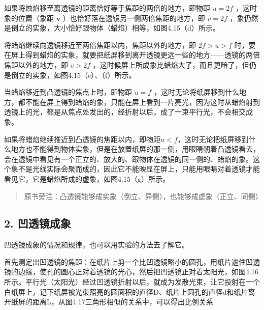 如果将烛焰移至离透镜的距离恰好等于焦距的两倍的地方，即物距 \(u = 2f\)
，这时象的位置（象距 \(\pmb{v}\)
）也恰好落在透镜另一侧两倍焦距的地方，即 \(v = 2f\)
，象仍然是倒立的实象，大小恰好跟物体（蜡焰）相等，如图4.15（d）所示。

将蜡焰继续向透镜移近至两倍焦距以内，焦距以外的地方，即 \(2f > u > f\)
时，要在屏上得到蜡焰的实象，就要把纸屏移到离开透镜更远一些的地方------透镜的两倍焦距以外的地方，即
\(v > 2f\)
，这时候屏上所成象比蜡焰大了，而且更暗了，但仍是倒立的实象，如图4.15（e）、（f）所示。

当蜡焰移近到凸透镜的焦点上时，即物距 \(u = f\)
，这时无论将纸屏移到什么地方，都不能在屏上得到蜡焰的象，只能在屏上看到一片亮光，因为这时从蜡焰射到透镜上的光，都是从焦点处发出的，经折射以后，成了一束平行光，不会相交成象。

如果将蜡焰继续推近到凸透镜的焦距以内，即物距\(u<f\)，这时无论把纸屏移到什么地方也不能得到物体实象，但是在放置纸屏的那一侧，用眼睛朝着凸透镜看去，会在透镜中看见有一个正立的、放大的、跟物体在透镜的同一侧的、蜡焰的象。这个象不是光线实际会聚而成的，因此它不能映显在屏上，只能用眼睛对着透镜才能看见它，它是蜡焰所成的虚象，如图4.15（g）所示。

\begin{quote}
原书旁注：凸透镜能够成实象（倒立、异侧），也能够成虚象（正立、同侧）
\end{quote}

\subsection{2. 凹透镜成象}

凹透镜成象的情况和规律，也可以用实验的方法去了解它。

首先测定出凹透镜的焦距：在纸片上剪一个比凹透镜略小的圆孔，用纸片遮住凹透镜的边缘，使孔的圆心正对着透镜的光心，然后把凹透镜正对着太阳光，如图4.16所示。平行光（太阳光）经过凹透镜折射以后，就成为发散光束，让它投射在一个白纸屏上，记下纸屏被光束照亮的圆面积的直径D、纸片上圆孔的直径d和纸片离开纸屏的距离L，从图4.17三角形相似的关系中，可以得出比例关系

